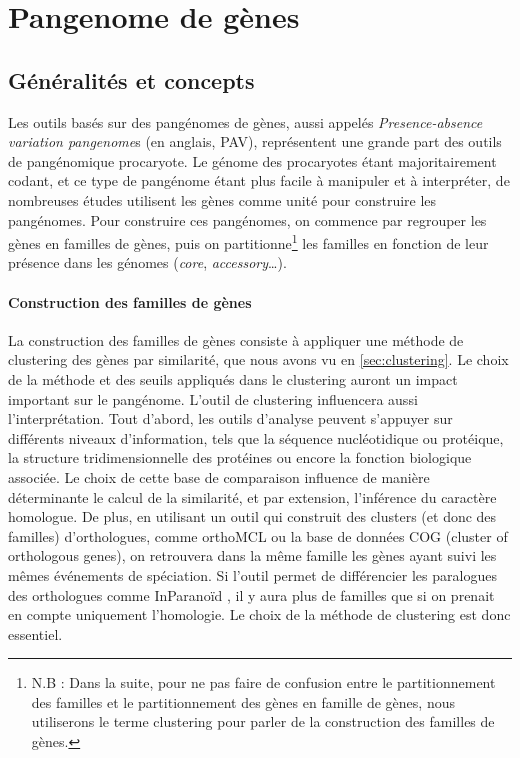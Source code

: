 \newpage
\section{Pangenome de gènes}

\subsection{Généralités et concepts}

Les outils basés sur des pangénomes de gènes, aussi appelés \textit{Presence-absence variation pangenome}s (en anglais, PAV), représentent une grande part des outils de pangénomique procaryote. Le génome des procaryotes étant majoritairement codant, et ce type de pangénome étant plus facile à manipuler et à interpréter, de nombreuses études utilisent les gènes comme unité pour construire les pangénomes. Pour construire ces pangénomes, on commence par regrouper les gènes en familles de gènes, puis on partitionne\footnote{N.B : Dans la suite, pour ne pas faire de confusion entre le partitionnement des familles et le partitionnement des gènes en famille de gènes, nous utiliserons le terme clustering pour parler de la construction des familles de gènes.} les familles en fonction de leur présence dans les génomes (\textit{core}, \textit{accessory}\dots).

\paragraph{Construction des familles de gènes}

La construction des familles de gènes consiste à appliquer une méthode de clustering des gènes par similarité, que nous avons vu en \autoref{sec:clustering}. Le choix de la méthode et des seuils appliqués dans le clustering auront un impact important sur le pangénome. L'outil de clustering influencera aussi l'interprétation. Tout d’abord, les outils d’analyse peuvent s’appuyer sur différents niveaux d’information, tels que la séquence nucléotidique ou protéique, la structure tridimensionnelle des protéines ou encore la fonction biologique associée. Le choix de cette base de comparaison influence de manière déterminante le calcul de la similarité, et par extension, l’inférence du caractère homologue. De plus, en utilisant un outil qui construit des clusters (et donc des familles) d'orthologues, comme orthoMCL \cite{li_orthomcl_2003} ou la base de données COG (cluster of orthologous genes), on retrouvera dans la même famille les gènes ayant suivi les mêmes événements de spéciation. Si l'outil permet de différencier les paralogues des orthologues comme InParanoïd \cite{remm_automatic_2001}, il y aura plus de familles que si on prenait en compte uniquement l'homologie. Le choix de la méthode de clustering est donc essentiel.


